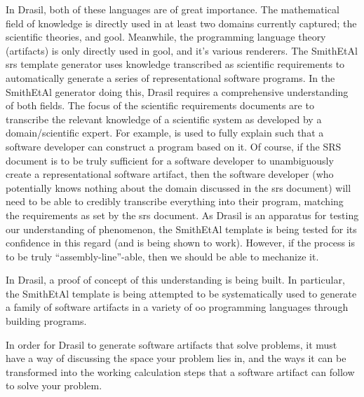 In Drasil, both of these languages are of great importance. The mathematical
field of knowledge is directly used in at least two domains currently captured;
the scientific theories, and \acs{gool}\cite{Carette2019}. Meanwhile, the
programming language theory (artifacts) is only directly used in \acs{gool}, and
it's various renderers. The SmithEtAl \acs{srs} \cite{SmithAndLai2005} template
generator uses knowledge transcribed as scientific requirements to automatically
generate a series of representational software programs. In the SmithEtAl
generator doing this, Drasil requires a comprehensive understanding of both
fields. The focus of the scientific requirements documents are to transcribe the
relevant knowledge of a scientific system as developed by a domain/scientific
expert. For example,  is used to fully explain
 such that a software developer can construct a program based on
it. Of course, if the SRS document is to be truly sufficient for a software
developer to unambiguously create a representational software artifact, then the
software developer (who potentially knows nothing about the domain discussed in
the \acs{srs} document) will need to be able to credibly transcribe everything
into their program, matching the requirements as set by the \acs{srs} document.
As Drasil is an apparatus for testing our understanding of phenomenon, the
SmithEtAl template is being tested for its confidence in this regard (and is
being shown to work). However, if the process is to be truly
``assembly-line''-able, then we should be able to mechanize it.

In Drasil, a proof of concept of this understanding is being built. In
particular, the SmithEtAl template is being attempted to be systematically used
to generate a family of software artifacts in a variety of \acl{oo} programming
languages through building  programs.

In order for Drasil to generate software artifacts that solve problems, it must
have a way of discussing the space your problem lies in, and the ways it can be
transformed into the working calculation steps that a software artifact can
follow to solve your problem.

